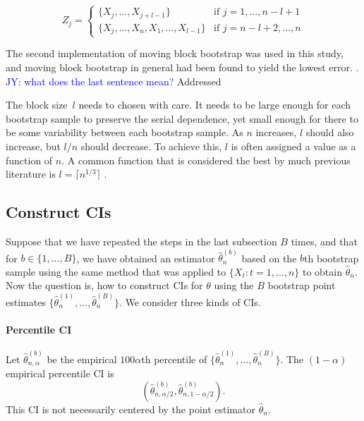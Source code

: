 \documentclass[12pt, letterpaper, titlepage]{article}
\newcommand{\jy}[1]{\textcolor{blue}{JY: #1}}
\begin{document}
\begin{equation}
Z_j =
    \begin{cases}
        \{X_j, \ldots, X_{j + l - 1}\} & \text{if } j = 1, \dots, n - l + 1\\
        \{X_j, \ldots, X_n, X_1, \ldots, X_{l - 1}\} & \text{if } j = n - l + 2 ,\dots, n
    \end{cases}
\end{equation}

The second implementation of moving block bootstrap was used in
this study, and moving block bootstrap in general had been found to yield the 
lowest error.
\citep{radovanov2014comparison}.  
\jy{what does the last sentence mean?} Addressed


The block size~$l$ needs to chosen with care. It needs to be large enough for
each bootstrap sample to preserve the serial dependence, yet small enough for
there to be some variability between each bootstrap sample. As $n$ increases,
$l$ should also increase, but $l / n$ should decrease. To achieve this, $l$ is
often assigned a value as a function of $n$. A common function that is
considered the best by much previous literature is $l = \lceil n^{1/3} \rceil$
\citep{buhlmann1999block}.


\subsection{Construct CIs}

Suppose that we have repeated the steps in the last subsection $B$ times, and
that for $b \in \{1, \ldots, B\}$, we have obtained an estimator
$\hat\theta_n^{(b)}$ based on the $b$th bootstrap sample using the same method
that was applied to $\{X_t: t = 1, \ldots, n\}$ to obtain $\hat\theta_n$.
Now the question is, how to construct CIs for $\theta$
using the $B$ bootstrap point estimates
$\{\hat\theta_n^{(1)}, \ldots, \hat\theta_n^{(B)}\}$.
We consider three kinds of CIs.


\paragraph{Percentile CI}
Let $\hat\theta_{n, \alpha}^{(b)}$ be the empirical $100\alpha$th percentile of
$\{\hat\theta_n^{(1)}, \ldots, \hat\theta_n^{(B)}\}$. The $(1 - \alpha)$
empirical percentile CI is
\[
(\hat\theta_{n, \alpha/2}^{(b)}, \hat\theta_{n, 1 - \alpha/2}^{(b)}).
\]
This CI is not necessarily centered by the point estimator $\hat\theta_n$.
\end{document}
